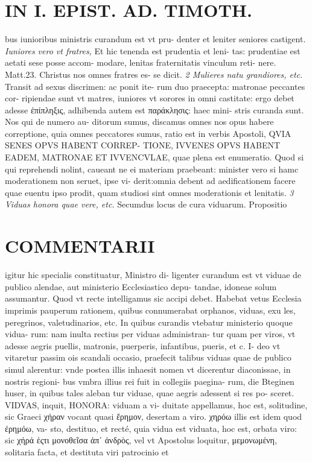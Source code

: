 \documentclass{article}
\begin{document}
\begin{pages}
\section*{IN I. EPIST. AD. TIMOTH. }
\marginpar{[ p.119 ]}\pstart bus iunioribus ministris curandum est vt pru- denter et leniter seniores castigent.  \pend
\textit{Iuniores vero vt fratres, }\pstart Et hic tenenda est prudentia et leni- tas: prudentiae est aetati sese posse accom- modare, lenitas fraternitatis vinculum reti- nere. Matt.23. Christus nos omnes fratres es- se dicit.  \pend
\textit{2 Mulieres natu grandiores, etc. }\pstart Transit ad sexus discrimen: ac ponit ite- rum duo praecepta: matronae peccantes cor- ripiendae sunt vt matres, iuniores vt sorores in omni castitate: ergo debet adesse ἐπίπληξις, adhibenda autem est παράκλησις: haec mini- stris curanda sunt. Nos qui de numero au- ditorum sumus, discamus omnes nos opus habere correptione, quia omnes peccatores sumus, ratio est in verbis Apostoli, QVIA SENES OPVS HABENT CORREP- TIONE, IVVENES OPVS HABENT EADEM, MATRONAE ET IVVENCVLAE, quae plena est enumeratio. Quod si qui reprehendi nolint, caueant ne ei materiam praebeant: minister vero si hamc moderationem non seruet, ipse vi- derit:omnia debent ad aedificationem facere quae euentu ipso prodit, quam studiosi sint omnes moderationis et lenitatis.  \pend
\textit{3 Viduas honora quae vere, etc. }\pstart Secumdus locus de cura viduarum. Propositio  \pend
\section*{COMMENTARII }
\marginpar{[ p.120 ]}\pstart igitur hic specialis constituatur, Ministro di- ligenter curandum est vt viduae de publico alendae, aut ministerio Ecclesiastico depu- tandae, idoneae solum assumantur. Quod vt recte intelligamus sic accipi debet. Habebat vetus Ecclesia imprimis pauperum rationem, quibus connumerabat orphanos, viduas, exu les, peregrinos, valetudinarios, etc. In quibus curandis vtebatur ministerio quoque vidua- rum: nam inulta rectius per viduas administran- tur quam per viros, vt adesse aegris puellis, matronis, puerperis, infantibus, pueris, et c. I- deo vt vitaretur passim ois scandali occasio, praefecit talibus viduas quae de publico simul alerentur: vnde postea illis inhaesit nomen vt dicerentur diaconissae, in nostris regioni- bus vmbra illius rei fuit in collegiis paegina- rum, die Bteginen huser, in quibus tales aleban tur viduae, quae aegris adessent si res po- sceret.  \pend\pstart VIDVAS, inquit, HONORA: viduam a vi- duitate appellamus, hoc est, solitudine, sic Graeci χήραν vocant quasi ἔρημον, desertam a viro. χηρόω illis est idem quod ἐρημόω, va- sto, destituo, et recté, quia vidua est viduata, hoc est, orbata viro: sic χήρά ἑςτι  μονοθεῖσα ἀπʹ ἀνδρὸς, vel vt Apostolus loquitur, μεμονωμένη, solitaria facta, et destituta viri patrocinio et  \pend

\end{pages}
\end{document}
